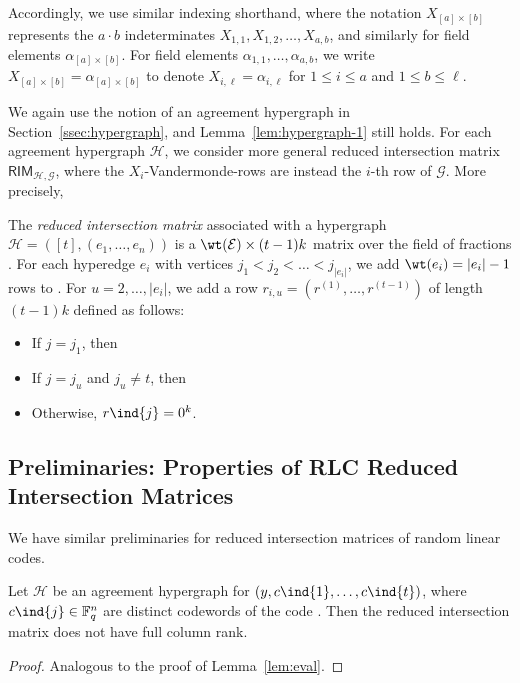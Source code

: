 \documentclass{article}[11pt]
\begin{document}
Accordingly, we use similar indexing shorthand, where the notation $X_{[a]\times [b]}$ represents the $a\cdot b$ indeterminates $X_{1,1},X_{1,2},\dots,X_{a,b}$, and similarly for field elements $\alpha_{[a]\times [b]}$.
For field elements $\alpha_{1,1},\dots,\alpha_{a,b}$, we write $X_{[a]\times [b]}=\alpha_{[a]\times [b]}$ to denote $X_{i,\ell}=\alpha_{i,\ell}$ for $1\le i\le a$ and $1\le b\le \ell$.


We again use the notion of an agreement hypergraph in Section~\ref{ssec:hypergraph}, and Lemma~\ref{lem:hypergraph-1} still holds.
For each agreement hypergraph $\mathcal{H}$, we consider more general reduced intersection matrix $\textsf{RIM}_{\mathcal{H},\mathcal{G}}$, where the $X_i$-Vandermonde-rows are instead the $i$-th row of $\mathcal{G}$.
More precisely,
\begin{definition}
  The \emph{reduced intersection matrix}  associated with a hypergraph $\mathcal{H}=([t],(e_1,\dots,e_n))$ is a $\wt(\mathcal{E}) \times (t-1)k$ matrix over the field of fractions .
  For each hyperedge $e_i$ with vertices $j_1<j_2<\dots<j_{|e_i|}$, we add $\wt(e_i) = |e_i|-1$ rows to .
  For $u=2,\dots,|e_i|$, we add a row $r_{i,u}=(r^{(1)},\ldots,r^{(t-1)})$ of length $(t-1)k$ defined as follows:
  \begin{itemize}
    \item If $j = j_1$, then 
    \item If $j = j_u$ and $j_u \neq t$, then 
    \item Otherwise, $r\ind{j} = 0^k$.
  \end{itemize}
    \label{def:rlc:rim}
\end{definition}

\subsection{Preliminaries: Properties of RLC Reduced Intersection Matrices}

We have similar preliminaries for reduced intersection matrices of random linear codes.

\begin{lemma}
  Let $\mathcal{H}$ be an agreement hypergraph for $(y,c\ind{1},\dots,c\ind{t})$, where $c\ind{j}\in\mathbb{F}_q^n$ are distinct codewords of the code .
    Then the reduced intersection matrix  does not have full column rank. \label{lem:rlc:eval}
  \label{}
\end{lemma}
\begin{proof}
  Analogous to the proof of Lemma~\ref{lem:eval}.
\end{proof}
\end{document}
